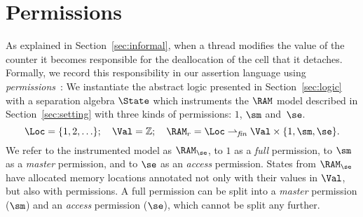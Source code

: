 
\section{Permissions}\label{sec:perm}





As  explained in Section~\ref{sec:informal},
when a thread modifies the value of the counter 
it becomes responsible for the deallocation of the  cell
that it detaches.
Formally, we record this responsibility in our assertion language using
\emph{permissions}~\cite{boyland,permissions}:
We instantiate the abstract logic
presented in Section~\ref{sec:logic} with 
a separation algebra $\State$ 
which instruments the $\RAM$ model described in Section~\ref{sec:setting} 
with three kinds of permissions: $1$, $\sm$ and~$\se$.
$$
\Loc = \{1, 2, \ldots\};
\quad 
\Val = \mathbb{Z};
\quad
\RAM_r 
= \Loc \rightharpoonup_{\it fin} \Val \times \{1, \sm, \se \}.
$$
We refer to the instrumented model as $\RAM_\se$,
to $1$ as a \emph{full} permission, to $\sm$ as a \emph{master} permission,
and to $\se$ as an \emph{access} permission.
States from $\RAM_{\se}$ have allocated memory
locations annotated not only with their values in $\Val$, but also with permissions.
A full permission can be
split into a {\em master} permission ($\sm$) and an {\em access} permission ($\se$), which 
cannot be split any further.

